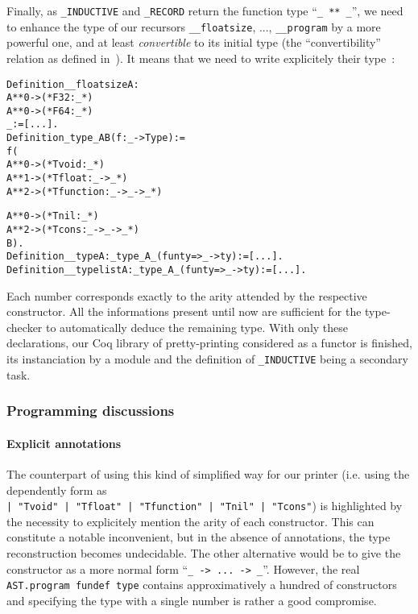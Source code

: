\documentclass[a4paper, 11pt]{article}
\newenvironment{coq}
  {%
   \begin{alltt}} %% 8.3pl1 (January 2011)
  {\end{alltt} %
  }
\begin{document}
Finally, as \verb|_INDUCTIVE| and \verb|_RECORD| return the function type ``\verb|_ ** _|'', we need to enhance the type of our recursors \verb|__floatsize|, ..., \verb|__program| by a more powerful one, and at least \emph{convertible} to its initial type (the ``convertibility'' relation as defined in~\cite{Coq:manual}). It means that we need to write explicitely their type~:
\begin{coq}
Definition __floatsize {A} : 
    A ** 0 ->                (* F32       :           _ *)
    A ** 0 ->                (* F64       :           _ *)
    _ := [...].
Definition _type_ A B (f : _ -> Type) := 
  f (
    A ** 0 ->                (* Tvoid     :           _ *)
    A ** 1 ->                (* Tfloat    : _ ->      _ *)
    A ** 2 ->                (* Tfunction : _ -> _ -> _ *)

    A ** 0 ->                (* Tnil      :           _ *)
    A ** 2 ->                (* Tcons     : _ -> _ -> _ *)
  B).
Definition __type {A} : _type_ A _ (fun ty => _ -> ty) := [...].
Definition __typelist {A} : _type_ A _ (fun ty => _ -> ty) := [...].
\end{coq}
Each number corresponds exactly to the arity attended by the respective constructor.
All the informations present until now are sufficient for the type-checker to automatically deduce the remaining type. With only these declarations, our Coq library of pretty-printing considered as a functor is finished, its instanciation by a module and the definition of \verb|_INDUCTIVE| being a secondary task.
\subsubsection{Programming discussions}
\paragraph{Explicit annotations}
The counterpart of using this kind of simplified way for our printer (i.e. using the dependently form as \\ 
\verb_| "Tvoid" | "Tfloat" | "Tfunction" | "Tnil" | "Tcons"_) is highlighted by the necessity to explicitely mention the arity of each constructor. This can constitute a notable inconvenient, but in the absence of annotations, the type reconstruction becomes undecidable.
The other alternative would be to give the constructor as a more normal form ``\verb|_ -> ... -> _|''. However, the real \verb|AST.program fundef type| contains approximatively a hundred of constructors and specifying the type with a single number is rather a good compromise.
\end{document}
